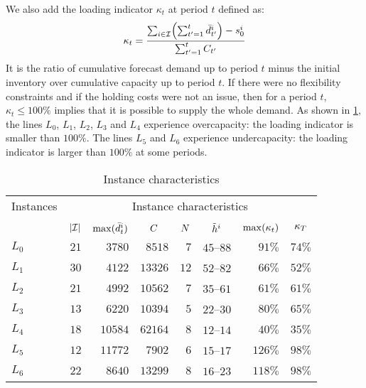 We also add the loading indicator $\kappa_t$ at period $t$ defined as:
\begin{equation}
  \kappa_t = \frac{\sum_{i\in\REF} \bracket{\sum_{t'=1}^{t} \bar{\demand}_{t'}^i}-\inventory_0^i}{ \sum_{t'=1}^{t} \capacity_{t'}}
\end{equation}
It is the ratio of cumulative forecast demand up to period $t$ minus the initial inventory over cumulative capacity up to period $t$.
If there were no flexibility constraints and if the holding costs were not an issue, then for a period $t$, $\kappa_t \le 100\%$ implies that it is possible to supply the whole demand.
As shown in \cref{tab:instances-characteristics}, the lines $L_0$, $L_1$, $L_2$, $L_3$ and $L_4$ experience overcapacity: the loading indicator is smaller than $100\%$.
The lines $L_5$ and $L_6$ experience undercapacity: the loading indicator is larger than $100\%$ at some periods.

\begin{table}[ht]
\begin{center}
\begin{tabular*}{\linewidth}{@{\extracolsep{\fill}}lrrrrrrr@{\extracolsep{\fill}}}
\hline
Instances &
\multicolumn{7}{c}{Instance characteristics}
\\\cline{2-8}
\\
& $\card{\REF}$
& $\max(\bar{d}_t^i)$
& \multicolumn{1}{c}{$C$}
& \multicolumn{1}{c}{$N$}
& \multicolumn{1}{c}{$\tilde{h}^i$}
& \multicolumn{1}{c}{$\max\bracket{\kappa_t}$}
& \multicolumn{1}{c}{$\kappa_{T}$}
\\\hline
$L_0$ & $21$ & $3780$ & $8518$ & $7$ & $45$--$88$ & $91\%$ & $74\%$
\\
$L_1$ & $30$ & $4122$ & $13326$ & $12$ & $52$--$82$ & $66\%$ & $52\%$
\\
$L_2$ & $21$ & $4992$ & $10562$ & $7$ & $35$--$61$ & $61\%$ & $61\%$
\\
$L_3$ & $13$ & $6220$ & $10394$ & $5$ & $22$--$30$ & $80\%$ & $65\%$
\\
$L_4$ & $18$ & $10584$ & $62164$ & $8$ & $12$--$14$ & $40\%$ & $35\%$
\\
$L_5$ & $12$ & $11772$ & $7902$ & $6$ & $15$--$17$ & $126\%$ & $98\%$
\\
$L_6$ & $22$ & $8640$ & $13299$ & $8$ & $16$--$23$ & $118\%$ & $98\%$
\\\hline
\end{tabular*}
\caption{Instance characteristics}
\label{tab:instances-characteristics}
\end{center}
\end{table}

